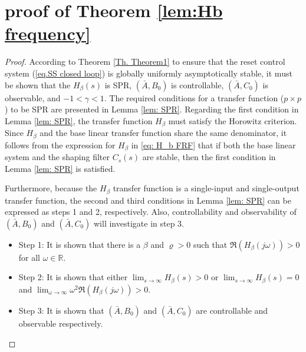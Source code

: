 \section{proof of Theorem \ref{lem:Hb frequency}}\label{App: II}
\begin{proof}
    According to Theorem \ref{Th. Theorem1} to ensure that the reset control system (\ref{eq.SS closed loop}) is globally uniformly asymptotically stable, it must be shown that the $H_\beta(s)$ is SPR, $(\bar{A},B_0)$ is controllable, $(\bar{A},C_0)$ is observable, and $-1<\gamma<1$. The required conditions for a transfer function ($p\times p$) to be SPR are presented in Lemma \ref{lem: SPR}. Regarding the first condition in Lemma \ref{lem: SPR}, the transfer function \( H_\beta \) must satisfy the Horowitz criterion. Since \( H_\beta \) and the base linear transfer function share the same denominator, it follows from the expression for \( H_\beta \) in \eqref{eq: H_b FRF} that if both the base linear system and the shaping filter \( C_s(s) \) are stable, then the first condition in Lemma \ref{lem: SPR} is satisfied.
    
    Furthermore, because the $H_\beta$ transfer function is a single-input and single-output transfer function, the second and third conditions in Lemma \ref{lem: SPR} can be expressed as steps 1 and 2, respectively. Also, controllability and observability of $(\bar{A},B_0)$ and $(\bar{A},C_0)$ will investigate in step 3.
\begin{itemize}
    \item Step 1: It is shown that there is a $\beta$ and $\varrho>0$ such that $\mathfrak{R}(H_\beta(j\omega)) > 0$ for all $\omega \in \mathbb{R}$.
    \item Step 2: It is shown that either $\lim_{s \to \infty}H_\beta (s) >0$ or $\lim_{s \to \infty}H_\beta (s) =0$ and $\lim_{\omega \to \infty} \omega^2\mathfrak{R}(H_\beta(j\omega))>0$.
    \item Step 3: It is shown that $(\bar{A},B_0)$ and $(\bar{A},C_0)$ are controllable and observable respectively.\\
    \label{th. theorem2}
\end{itemize}


\end{proof}

